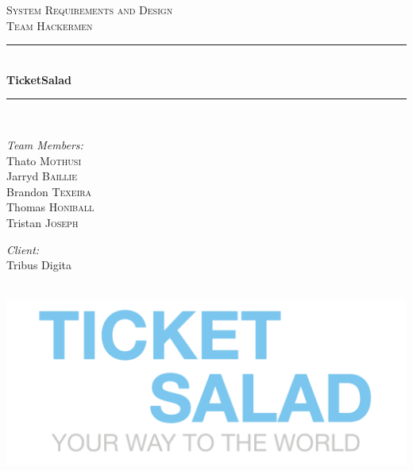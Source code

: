 \documentclass[11pt]{article}
\begin{document}
	\begin{titlepage}
		
		\newcommand{\HRule}{\rule{\linewidth}{0.5mm}} 
		
		\center 
		
		\textsc{\LARGE System Requirements and Design}\\[0.5cm] 
		\textsc{\Large Team Hackermen}\\[0.5cm] 
		
		\HRule \\[0.4cm]
		{ \huge \bfseries TicketSalad}\\[0.4cm] 
		\HRule \\[1.5cm]
		
		\begin{minipage}{0.4\textwidth}
			\begin{flushleft} \large
				\emph{Team Members:}\\
				Thato \textsc{Mothusi}\\
				Jarryd \textsc{Baillie}\\
				Brandon \textsc{Texeira}\\
				Thomas \textsc{Honiball}\\
				Tristan \textsc{Joseph}\\
			\end{flushleft}
		\end{minipage}
		
		\begin{minipage}{0.4\textwidth}
			\begin{flushright} \large
				\emph{Client:} \\
				Tribus Digita 
			\end{flushright}
		\end{minipage}\\[2cm]
		
		\includegraphics{logo.png}\\[1cm] 
		
	\end{titlepage}
	\newpage
	\tableofcontents
	\newpage
\end{document}
